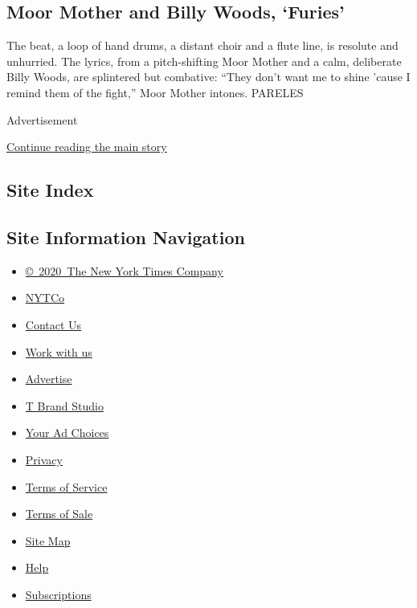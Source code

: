 \hypertarget{moor-mother-and-billy-woods-furies}{%
\subsection{Moor Mother and Billy Woods,
`Furies'}\label{moor-mother-and-billy-woods-furies}}

The beat, a loop of hand drums, a distant choir and a flute line, is
resolute and unhurried. The lyrics, from a pitch-shifting Moor Mother
and a calm, deliberate Billy Woods, are splintered but combative: ``They
don't want me to shine 'cause I remind them of the fight,'' Moor Mother
intones. PARELES

Advertisement

\protect\hyperlink{after-bottom}{Continue reading the main story}

\hypertarget{site-index}{%
\subsection{Site Index}\label{site-index}}

\hypertarget{site-information-navigation}{%
\subsection{Site Information
Navigation}\label{site-information-navigation}}

\begin{itemize}
\tightlist
\item
  \href{https://help.nytimes3xbfgragh.onion/hc/en-us/articles/115014792127-Copyright-notice}{©~2020~The
  New York Times Company}
\end{itemize}

\begin{itemize}
\tightlist
\item
  \href{https://www.nytco.com/}{NYTCo}
\item
  \href{https://help.nytimes3xbfgragh.onion/hc/en-us/articles/115015385887-Contact-Us}{Contact
  Us}
\item
  \href{https://www.nytco.com/careers/}{Work with us}
\item
  \href{https://nytmediakit.com/}{Advertise}
\item
  \href{http://www.tbrandstudio.com/}{T Brand Studio}
\item
  \href{https://www.nytimes3xbfgragh.onion/privacy/cookie-policy\#how-do-i-manage-trackers}{Your
  Ad Choices}
\item
  \href{https://www.nytimes3xbfgragh.onion/privacy}{Privacy}
\item
  \href{https://help.nytimes3xbfgragh.onion/hc/en-us/articles/115014893428-Terms-of-service}{Terms
  of Service}
\item
  \href{https://help.nytimes3xbfgragh.onion/hc/en-us/articles/115014893968-Terms-of-sale}{Terms
  of Sale}
\item
  \href{https://spiderbites.nytimes3xbfgragh.onion}{Site Map}
\item
  \href{https://help.nytimes3xbfgragh.onion/hc/en-us}{Help}
\item
  \href{https://www.nytimes3xbfgragh.onion/subscription?campaignId=37WXW}{Subscriptions}
\end{itemize}
